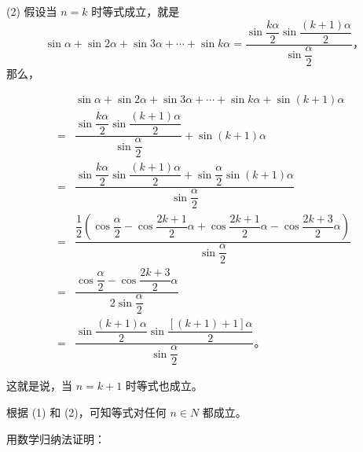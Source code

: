 (2) 假设当 $n = k$ 时等式成立，就是
$$ \sin \alpha + \sin 2\alpha + \sin 3\alpha + \cdots + \sin k\alpha = \dfrac{\sin \dfrac{k\alpha}{2} \sin \dfrac{(k+1)\alpha}{2}}{\sin \dfrac{\alpha}{2}} \text{，} $$
那么，

\begin{align*}
      & \sin \alpha + \sin 2\alpha + \sin 3\alpha + \cdots + \sin k\alpha + \sin (k+1)\alpha \\
    = & \dfrac{\sin \dfrac{k\alpha}{2} \sin \dfrac{(k+1)\alpha}{2}}{\sin \dfrac{\alpha}{2}} + \sin (k+1)\alpha \\
    = & \dfrac{\sin \dfrac{k\alpha}{2} \sin \dfrac{(k+1)\alpha}{2} +  \sin \dfrac{\alpha}{2} \sin (k+1)\alpha}{\sin \dfrac{\alpha}{2}} \\
    = & \dfrac{\dfrac{1}{2} \left( \cos\dfrac{\alpha}{2} - \cos\dfrac{2k+1}{2}\alpha + \cos\dfrac{2k+1}{2}\alpha - \cos\dfrac{2k+3}{2}\alpha \right)}{\sin\dfrac{\alpha}{2}} \\
    = & \dfrac{\cos\dfrac{\alpha}{2} - \cos\dfrac{2k+3}{2}\alpha}{2\sin\dfrac{\alpha}{2}} \\
    = & \dfrac{\sin\dfrac{(k+1)\alpha}{2} \sin\dfrac{[(k+1)+1]\alpha}{2}}{\sin\dfrac{\alpha}{2}} \text{。}
\end{align*}

这就是说，当 $n = k + 1$ 时等式也成立。

根据 (1) 和 (2)，可知等式对任何 $n \in N$ 都成立。


\lianxi

用数学归纳法证明：

\begin{xiaotis}





\end{xiaotis}

